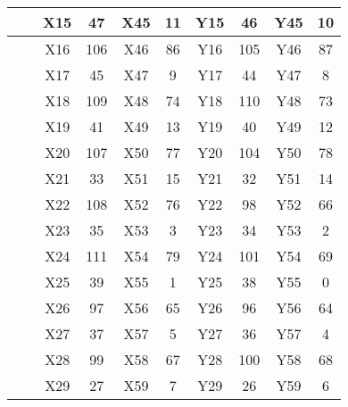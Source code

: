 {\begin{tabular}{|c|c|c|c|c|c|c|c|c|c|}
          &        & X15    & 47     & X45    & 11     & Y15    & 46     & Y45    & 10     \\ \hline
          &        & X16    & 106    & X46    & 86     & Y16    & 105    & Y46    & 87     \\ \hline
          &        & X17    & 45     & X47    & 9      & Y17    & 44     & Y47    & 8      \\ \hline
          &        & X18    & 109    & X48    & 74     & Y18    & 110    & Y48    & 73     \\ \hline
          &        & X19    & 41     & X49    & 13     & Y19    & 40     & Y49    & 12     \\ \hline
          &        & X20    & 107    & X50    & 77     & Y20    & 104    & Y50    & 78     \\ \hline
          &        & X21    & 33     & X51    & 15     & Y21    & 32     & Y51    & 14     \\ \hline
          &        & X22    & 108    & X52    & 76     & Y22    & 98     & Y52    & 66     \\ \hline
          &        & X23    & 35     & X53    & 3      & Y23    & 34     & Y53    & 2      \\ \hline
          &        & X24    & 111    & X54    & 79     & Y24    & 101    & Y54    & 69     \\ \hline
          &        & X25    & 39     & X55    & 1      & Y25    & 38     & Y55    & 0      \\ \hline
          &        & X26    & 97     & X56    & 65     & Y26    & 96     & Y56    & 64     \\ \hline
          &        & X27    & 37     & X57    & 5      & Y27    & 36     & Y57    & 4      \\ \hline
          &        & X28    & 99     & X58    & 67     & Y28    & 100    & Y58    & 68     \\ \hline
          &        & X29    & 27     & X59    & 7      & Y29    & 26     & Y59    & 6      \\ \hline
  
  \end{tabular}
}